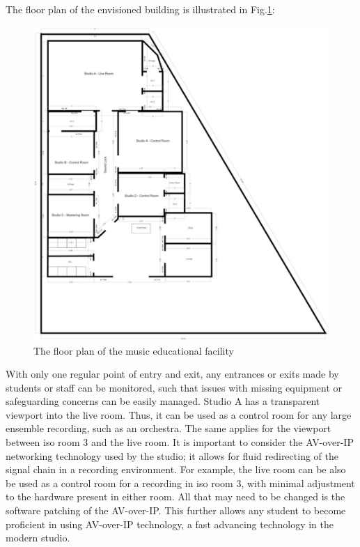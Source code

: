 \documentclass[10pt, twocolumn]{article}
\begin{document}
        The floor plan of the envisioned building is illustrated in Fig.\ref{floorplan}:
        \begin{figure}
            \centering
            \centerline{\includegraphics[scale = 0.8]{resources/floorplan.png}}
            \caption{The floor plan of the music educational facility}
            \label{floorplan}
        \end{figure}
        With only one regular point of entry and exit, any entrances or exits made by students or staff can be monitored, such that issues with missing equipment or safeguarding concerns can be easily managed.
        Studio A has a transparent viewport into the live room.
        Thus, it can be used as a control room for any large ensemble recording, such as an orchestra.
        The same applies for the viewport between iso room 3 and the live room.
        It is important to consider the AV-over-IP networking technology used by the studio; it allows for fluid redirecting of the signal chain in a recording environment.
        For example, the live room can be also be used as a control room for a recording in iso room 3, with minimal adjustment to the hardware present in either room.
        All that may need to be changed is the software patching of the AV-over-IP.
        This further allows any student to become proficient in using AV-over-IP technology, a fast advancing technology in the modern studio.
\end{document}
